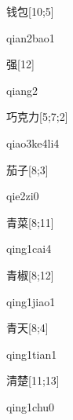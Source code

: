 \begin{verbete}{钱包}[10;5]
\begin{pronuncia}{qian2bao1}
\end{pronuncia}
\end{verbete}

\begin{verbete}[qiang2]{强}[12]
\begin{pronuncia}{qiang2}
\end{pronuncia}
\end{verbete}

\begin{verbete}[qiao3ke4li4]{巧克力}[5;7;2]
\begin{pronuncia}{qiao3ke4li4}
\end{pronuncia}
\end{verbete}

\begin{verbete}[qie2zi0]{茄子}[8;3]
\begin{pronuncia}{qie2zi0}
\end{pronuncia}
\end{verbete}

\begin{verbete}{青菜}[8;11]
\begin{pronuncia}{qing1cai4}
\end{pronuncia}
\end{verbete}

\begin{verbete}{青椒}[8;12]
\begin{pronuncia}{qing1jiao1}
\end{pronuncia}
\end{verbete}

\begin{verbete}{青天}[8;4]
\begin{pronuncia}{qing1tian1}
\end{pronuncia}
\end{verbete}

\begin{verbete}{清楚}[11;13]
\begin{pronuncia}{qing1chu0}
\end{pronuncia}
\end{verbete}

